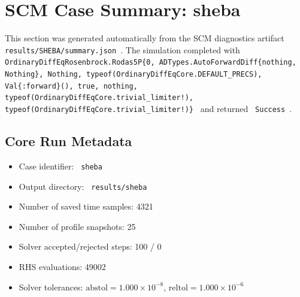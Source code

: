 \section{SCM Case Summary: sheba}
\label{sec:scm_case_sheba_sheba_160x2m_12h_report}

This section was generated automatically from the SCM diagnostics artifact
\texttt{ results/SHEBA/summary.json }. The simulation completed with \texttt{ OrdinaryDiffEqRosenbrock.Rodas5P\{0, ADTypes.AutoForwardDiff\{nothing, Nothing\}, Nothing, typeof(OrdinaryDiffEqCore.DEFAULT\_PRECS), Val\{:forward\}(), true, nothing, typeof(OrdinaryDiffEqCore.trivial\_limiter!), typeof(OrdinaryDiffEqCore.trivial\_limiter!)\} }
and returned \texttt{ Success }.

\subsection{Core Run Metadata}
\begin{itemize}
  \item Case identifier: \texttt{ sheba }
  \item Output directory: \texttt{ results/sheba }
  \item Number of saved time samples: 4321
  \item Number of profile snapshots: 25
  \item Solver accepted/rejected steps: 100 / 0
  \item RHS evaluations: 49002
  \item Solver tolerances: $\mathrm{abstol}=1.000 \times 10^{-8}$, $\mathrm{reltol}=1.000 \times 10^{-6}$
\end{itemize}

